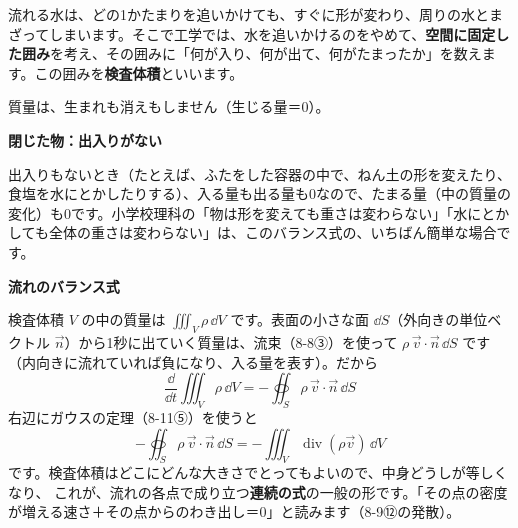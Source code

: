 \leavevmode\label{ph:力-13:sec6}流れる水は、どの1かたまりを追いかけても、すぐに形が変わり、周りの水とまざってしまいます。そこで工学では、水を追いかけるのをやめて、\textbf{空間に固定した囲み}を考え、その囲みに「何が入り、何が出て、何がたまったか」を数えます。この囲みを\textbf{検査体積}といいます。
\begin{bkfigure}
\label{ph:力-13:fig-kensa}
\end{bkfigure}
質量は、生まれも消えもしません（生じる量＝0）。

\noindent\textbf{閉じた物：出入りがない}\par\nobreak
\label{ph:力-13:mass}出入りもないとき（たとえば、ふたをした容器の中で、ねん土の形を変えたり、食塩を水にとかしたりする）、入る量も出る量も0なので、たまる量（中の質量の変化）も0です。小学校理科の「物は形を変えても重さは変わらない」「水にとかしても全体の重さは変わらない」は、このバランス式の、いちばん簡単な場合です。

\noindent\textbf{流れのバランス式}\par\nobreak
検査体積 $V$ の中の質量は $\iiint_V\rho\,\dd V$ です。表面の小さな面 $\dd S$（外向きの単位ベクトル $\vec{n}$）から1秒に出ていく質量は、流束（8-8③）を使って $\rho\,\vec{v}\cdot\vec{n}\,\dd S$ です（内向きに流れていれば負になり、入る量を表す）。だから
\[ \frac{\dd}{\dd t}\iiint_V\rho\,\dd V=-\oiint_S\rho\,\vec{v}\cdot\vec{n}\,\dd S \]
右辺にガウスの定理（8-11⑤）を使うと
\[ -\oiint_S\rho\,\vec{v}\cdot\vec{n}\,\dd S=-\iiint_V\operatorname{div}(\rho\vec{v})\,\dd V \]
です。検査体積はどこにどんな大きさでとってもよいので、中身どうしが等しくなり、
これが、流れの各点で成り立つ\textbf{連続の式}の一般の形です。「その点の密度が増える速さ＋その点からのわき出し＝0」と読みます（8-9⑫の発散）。


